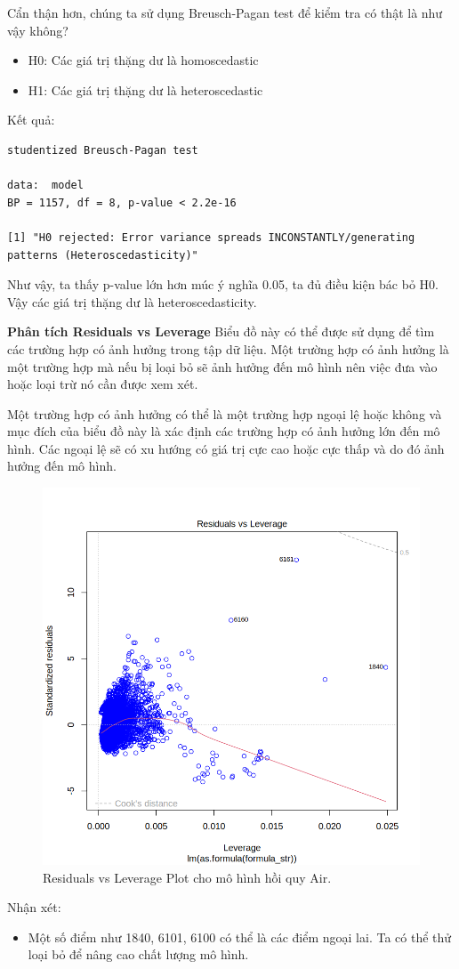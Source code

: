 Cẩn thận hơn, chúng ta sử dụng Breusch-Pagan test để kiểm tra có thật là như vậy không?
\begin{itemize}
    \item H0: Các giá trị thặng dư là homoscedastic
    \item H1: Các giá trị thặng dư là heteroscedastic
\end{itemize}
Kết quả:
\begin{lstlisting}
studentized Breusch-Pagan test

data:  model
BP = 1157, df = 8, p-value < 2.2e-16

[1] "H0 rejected: Error variance spreads INCONSTANTLY/generating patterns (Heteroscedasticity)"
\end{lstlisting}
Như vậy, ta thấy p-value lớn hơn múc ý nghĩa 0.05, ta đủ điều kiện bác bỏ H0. Vậy các giá trị thặng dư là heteroscedasticity.

\textbf{Phân tích Residuals vs Leverage} Biểu đồ này có thể được sử dụng để tìm các trường hợp có ảnh hưởng trong tập dữ liệu. Một trường hợp có ảnh hưởng là một trường hợp mà nếu bị loại bỏ sẽ ảnh hưởng đến mô hình nên việc đưa vào hoặc loại trừ nó cần được xem xét.

Một trường hợp có ảnh hưởng có thể là một trường hợp ngoại lệ hoặc không và mục đích của biểu đồ này là xác định các trường hợp có ảnh hưởng lớn đến mô hình. Các ngoại lệ sẽ có xu hướng có giá trị cực cao hoặc cực thấp và do đó ảnh hưởng đến mô hình.

\begin{figure}[H]
    \centering
    \includegraphics[width=0.75\columnwidth]{air_figures/best_model_air_residual_leverage.png}
    \caption{Residuals vs Leverage Plot cho mô hình hồi quy Air.}
    \label{fig:best_model_air_residual_leverage}
\end{figure}
Nhận xét:
\begin{itemize}
    \item Một số điểm như 1840, 6101, 6100 có thể là các điểm ngoại lai. Ta có thể thử loại bỏ để nâng cao chất lượng mô hình.
\end{itemize}

